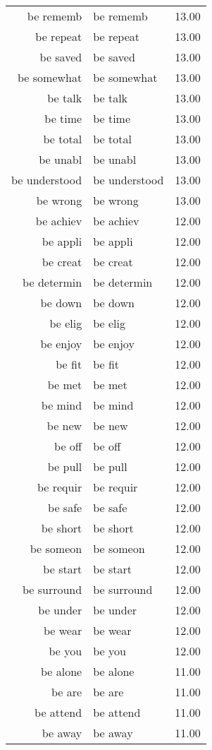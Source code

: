 \begin{table}[ht]
\begin{tabular}{rlr}
  be rememb & be rememb & 13.00 \\ 
  be repeat & be repeat & 13.00 \\ 
  be saved & be saved & 13.00 \\ 
  be somewhat & be somewhat & 13.00 \\ 
  be talk & be talk & 13.00 \\ 
  be time & be time & 13.00 \\ 
  be total & be total & 13.00 \\ 
  be unabl & be unabl & 13.00 \\ 
  be understood & be understood & 13.00 \\ 
  be wrong & be wrong & 13.00 \\ 
  be achiev & be achiev & 12.00 \\ 
  be appli & be appli & 12.00 \\ 
  be creat & be creat & 12.00 \\ 
  be determin & be determin & 12.00 \\ 
  be down & be down & 12.00 \\ 
  be elig & be elig & 12.00 \\ 
  be enjoy & be enjoy & 12.00 \\ 
  be fit & be fit & 12.00 \\ 
  be met & be met & 12.00 \\ 
  be mind & be mind & 12.00 \\ 
  be new & be new & 12.00 \\ 
  be off & be off & 12.00 \\ 
  be pull & be pull & 12.00 \\ 
  be requir & be requir & 12.00 \\ 
  be safe & be safe & 12.00 \\ 
  be short & be short & 12.00 \\ 
  be someon & be someon & 12.00 \\ 
  be start & be start & 12.00 \\ 
  be surround & be surround & 12.00 \\ 
  be under & be under & 12.00 \\ 
  be wear & be wear & 12.00 \\ 
  be you & be you & 12.00 \\ 
  be alone & be alone & 11.00 \\ 
  be are & be are & 11.00 \\ 
  be attend & be attend & 11.00 \\ 
  be away & be away & 11.00 \\ 

\end{tabular}
\end{table}
